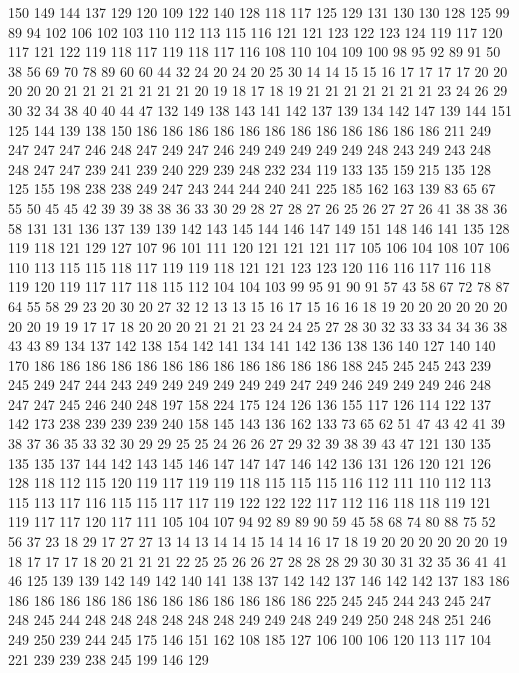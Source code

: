 150 149 144 137 129 120 109 122 140 128 118 117 125 129 131 130 130 128 125 99
89 94 102 106 102 103 110 112 113 115 116 121 121 123 122 123 124 119 117 120
117 121 122 119 118 117 119 118 117 116 108 110 104 109 100 98 95 92 89 91
50 38 56 69 70 78 89 60 60 44 32 24 20 24 20 25 30 14 14 15
15 16 17 17 17 17 20 20 20 20 20 21 21 21 21 21 21 21 20 19
18 17 18 19 21 21 21 21 21 21 21 23 24 26 29 30 32 34 38 40
40 44 47 132 149 138 143 141 142 137 139 134 142 147 139 144 151 125 144 139
138 150 186 186 186 186 186 186 186 186 186 186 186 186 211 249 247 247 247 246
248 247 249 247 246 249 249 249 249 249 248 243 249 243 248 248 247 247 239 241
239 240 229 239 248 232 234 119 133 135 159 215 135 128 125 155 198 238 238 249
247 243 244 244 240 241 225 185 162 163 139 83 65 67 55 50 45 45 42 39
39 38 38 36 33 30 29 28 27 28 27 26 25 26 27 27 26 41 38 38
36 58 131 131 136 137 139 139 142 143 145 144 146 147 149 151 148 146 141 135
128 119 118 121 129 127 107 96 101 111 120 121 121 121 117 105 106 104 108 107
106 110 113 115 115 118 117 119 119 118 121 121 123 123 120 116 116 117 116 118
119 120 119 117 117 118 115 112 104 104 103 99 95 91 90 91 57 43 58 67
72 78 87 64 55 58 29 23 20 30 20 27 32 12 13 13 15 16 17 15
16 16 18 19 20 20 20 20 20 20 20 20 19 19 17 17 18 20 20 20
21 21 21 23 24 24 25 27 28 30 32 33 33 34 34 36 38 43 43 89
134 137 142 138 154 142 141 134 141 142 136 138 136 140 127 140 140 170 186 186
186 186 186 186 186 186 186 186 186 186 188 245 245 245 243 239 245 249 247 244
243 249 249 249 249 249 249 247 249 246 249 249 249 246 248 247 247 245 246 240
248 197 158 224 175 124 126 136 155 117 126 114 122 137 142 173 238 239 239 239
240 158 145 143 136 162 133 73 65 62 51 47 43 42 41 39 38 37 36 35
33 32 30 29 29 25 25 24 26 26 27 29 32 39 38 39 43 47 121 130
135 135 135 137 144 142 143 145 146 147 147 147 146 142 136 131 126 120 121 126
128 118 112 115 120 119 117 119 119 118 115 115 115 116 112 111 110 112 113 115
113 117 116 115 115 117 117 119 122 122 122 117 112 116 118 118 119 121 119 117
117 120 117 111 105 104 107 94 92 89 89 90 59 45 58 68 74 80 88 75
52 56 37 23 18 29 17 27 27 13 14 13 14 14 15 14 14 16 17 18
19 20 20 20 20 20 20 19 18 17 17 17 18 20 21 21 21 22 25 25
26 26 27 28 28 28 29 30 30 31 32 35 36 41 41 46 125 139 139 142
149 142 140 141 138 137 142 142 137 146 142 142 137 183 186 186 186 186 186 186
186 186 186 186 186 186 186 225 245 245 244 243 245 247 248 245 244 248 248 248
248 248 248 249 249 248 249 249 250 248 248 251 246 249 250 239 244 245 175 146
151 162 108 185 127 106 100 106 120 113 117 104 221 239 239 238 245 199 146 129
